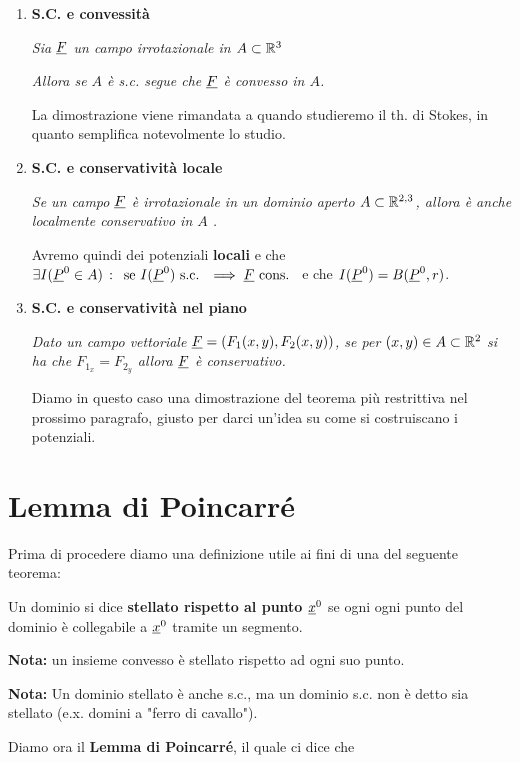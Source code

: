 \begin{enumerate}
	\item \textbf{S.C. e convessità}
	
	\textit{Sia $\underline{F}$ un campo irrotazionale in $A\subset \mathbb{R}^3$}
	
	\textit{Allora se $A$ è s.c. segue che $\underline{F}$ è convesso in $A$.}
	
	La dimostrazione viene rimandata a quando studieremo il th. di Stokes, in quanto semplifica notevolmente lo studio.
	
	
	\item \textbf{S.C. e conservatività locale}
	
	\textit{Se un campo $\underline{F}$ è irrotazionale in un dominio aperto $A\subset\mathbb{R}^{2,3}$, allora è anche localmente conservativo in $A$ .}
	
	Avremo quindi dei potenziali \textbf{locali} e che $\exists I(\underline{P}^0 \in A) \, : \, \text{ se } I(\underline{P}^0) \text{ s.c. } \implies \underline{F} \text{ cons. }$ e che $I(\underline{P}^0)=B(\underline{P}^0,r)$.
	
	\item \textbf{S.C. e conservatività nel piano}	
	
	\textit{Dato un campo vettoriale $\underline{F}=(F_1(x,y),F_2(x,y))$, se per $(x,y)\in A\subset \mathbb{R}^2$ si ha che $F_{1_x}=F_{2_y}$ allora $\underline{F}$ è conservativo.}
	
	Diamo in questo caso una dimostrazione del teorema più restrittiva nel prossimo paragrafo, giusto per darci un'idea su come si costruiscano i potenziali.
\end{enumerate}

\newpage

\section{Lemma di Poincarré}

Prima di procedere diamo una definizione utile ai fini di una del seguente teorema:

Un dominio si dice \textbf{stellato rispetto al punto $\underline{x}^0$} se ogni ogni punto del dominio è collegabile a $\underline{x}^0$ tramite un segmento.

\textbf{Nota:} un insieme convesso è stellato rispetto ad ogni suo punto. 

\textbf{Nota:} Un dominio stellato è anche s.c., ma un dominio s.c. non è detto sia stellato (e.x. domini a "ferro di cavallo").

\bigskip

Diamo ora il \textbf{Lemma di Poincarré}, il quale ci dice che

